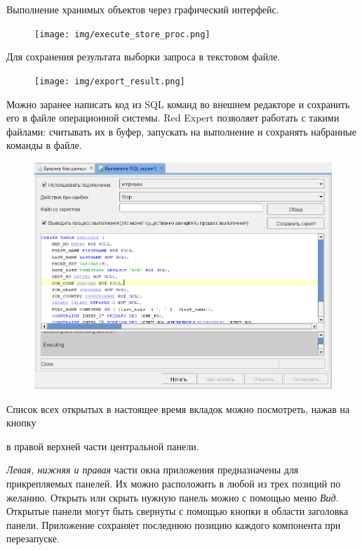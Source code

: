 Выполнение хранимых объектов через графический интерфейс.
	\begin{figure}[H]
		\centering
		\texttt{[image: img/execute\_store\_proc.png]}
	\end{figure}
	

Для сохранения результата выборки  запроса в текстовом файле.
	\begin{figure}[H]
		\centering
		\texttt{[image: img/export\_result.png]}
	\end{figure}

Можно заранее написать код из SQL команд во внешнем редакторе и сохранить его в файле операционной системы. Red Expert позволяет работать с такими файлами: считывать их в буфер, запускать на выполнение и сохранять набранные команды в файле.

	\begin{figure}[H]
		\centering
		\includegraphics[width = 0.8\linewidth]{img/execute_script.png}
	\end{figure}

Список всех открытых в настоящее время вкладок можно посмотреть, нажав на кнопку  в правой верхней части центральной панели.


\textit{Левая, нижняя и правая} части окна приложения предназначены для прикрепляемых панелей. Их можно расположить в любой из трех позиций по желанию. Открыть или скрыть нужную панель можно с помощью меню \textit{Вид}. Открытые панели могут быть свернуты с помощью кнопки в области заголовка панели. Приложение сохраняет последнюю позицию каждого компонента при перезапуске.

